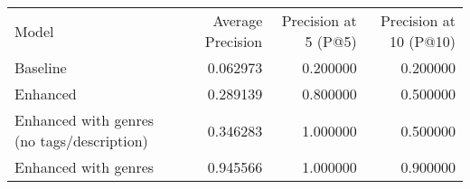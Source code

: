 \begin{tabular}{lrrr}
Model & Average Precision & Precision at 5 (P@5) & Precision at 10 (P@10) \\
Baseline & 0.062973 & 0.200000 & 0.200000 \\
Enhanced & 0.289139 & 0.800000 & 0.500000 \\
Enhanced with genres (no tags/description) & 0.346283 & 1.000000 & 0.500000 \\
Enhanced with genres & 0.945566 & 1.000000 & 0.900000 \\
\end{tabular}
